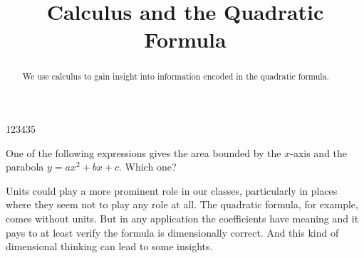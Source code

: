 \documentclass{ximera}
\title{Calculus and the Quadratic Formula}
\begin{document}
\begin{abstract}
We use calculus to gain insight into information encoded in the quadratic formula.
\end{abstract}
\maketitle

123435

\begin{exercise}  
  One of the following expressions gives the area bounded by the $x$-axis and the parabola $y=ax^2+bx+c$. Which one?  
  \begin{multipleChoice}  
  \end{multipleChoice}  
\end{exercise}  

 
 
 



Units could play a more prominent role in our classes, particularly in places where they seem not to play any role at all. The quadratic formula, for example, comes without units. But in any application the coefficients have meaning and it pays to at least verify the formula is dimensionally correct. And this kind of dimensional thinking can lead to some insights. %
\end{document}
